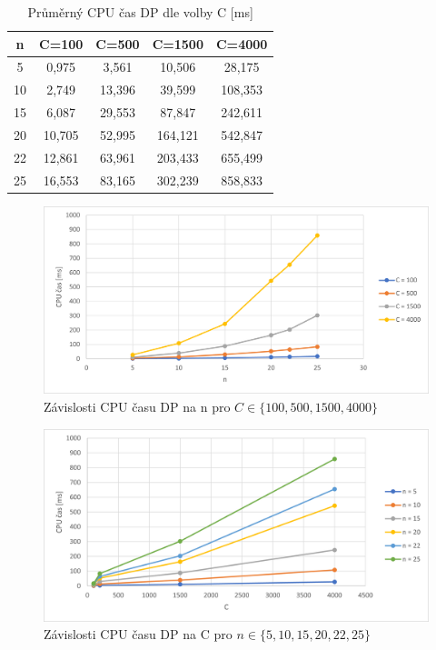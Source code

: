 \documentclass[12pt]{article}
\begin{document}
\begin{table}
    \begin{center}
         \begin{tabular}{|c | c | c | c | c|} 
         \hline
         n & C=100 & C=500 & C=1500 & C=4000 \\ [0.1ex] 
         \hline\hline
            5 & 0,975 & 3,561 & 10,506 & 28,175 \\
            \hline
            10 & 2,749 & 13,396 & 39,599 & 108,353 \\
            \hline
            15 & 6,087 & 29,553 & 87,847 & 242,611 \\
            \hline
            20 & 10,705 & 52,995 & 164,121 & 542,847 \\
            \hline
            22 & 12,861 & 63,961 & 203,433 & 655,499 \\
            \hline
            25 & 16,553 & 83,165 & 302,239 & 858,833 \\
            \hline
        \end{tabular}
        \caption{Průměrný CPU čas DP dle volby C [ms]}
        \label{tab:dp_C}
    \end{center}
\end{table}

\begin{figure}[ht]\centering
    \includegraphics[width=1\textwidth, keepaspectratio]{graphs/dp/dp_time_n_dep.png}
    \caption{Závislosti CPU času DP na n pro $C \in \{100, 500, 1500, 4000\}$}
    \label{fig:dp_time_n_dep}
\end{figure}

\begin{figure}[ht]\centering
    \includegraphics[width=1\textwidth, keepaspectratio]{graphs/dp/dp_time_C_dep.png}
    \caption{Závislosti CPU času DP na C pro $n \in \{5, 10, 15, 20, 22, 25\}$}
    \label{fig:dp_time_C_dep}
\end{figure}
\end{document}
